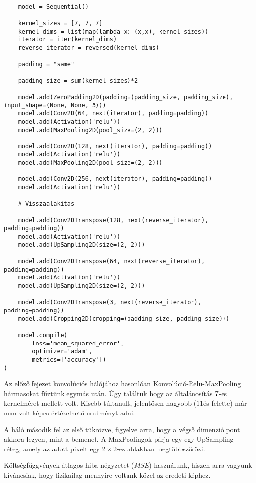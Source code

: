 \lstset{language=Python}
\begin{lstlisting}  

	model = Sequential()
	
	kernel_sizes = [7, 7, 7]
	kernel_dims = list(map(lambda x: (x,x), kernel_sizes))
	iterator = iter(kernel_dims)
	reverse_iterator = reversed(kernel_dims)
	
	padding = "same"
	
	padding_size = sum(kernel_sizes)*2
	
	model.add(ZeroPadding2D(padding=(padding_size, padding_size), input_shape=(None, None, 3)))
	model.add(Conv2D(64, next(iterator), padding=padding))
	model.add(Activation('relu'))
	model.add(MaxPooling2D(pool_size=(2, 2)))
	
	model.add(Conv2D(128, next(iterator), padding=padding))
	model.add(Activation('relu'))
	model.add(MaxPooling2D(pool_size=(2, 2)))
	
	model.add(Conv2D(256, next(iterator), padding=padding))
	model.add(Activation('relu'))
	
	# Visszaalakitas
	
	model.add(Conv2DTranspose(128, next(reverse_iterator), padding=padding))
	model.add(Activation('relu'))
	model.add(UpSampling2D(size=(2, 2)))
	
	model.add(Conv2DTranspose(64, next(reverse_iterator), padding=padding))
	model.add(Activation('relu'))
	model.add(UpSampling2D(size=(2, 2)))
	
	model.add(Conv2DTranspose(3, next(reverse_iterator), padding=padding))
	model.add(Cropping2D(cropping=(padding_size, padding_size)))
	
	model.compile(
		loss='mean_squared_error',
		optimizer='adam', 
		metrics=['accuracy']) 
) 

\end{lstlisting}


Az előző fejezet konvolúciós hálójához hasonlóan Konvolúció-Relu-MaxPooling hármasokat
fűztünk egymás után. Úgy találtuk hogy az általánosítás $ 7 \time 7 $-es kernelméret 
mellett volt. Kisebb túltanult, jelentősen nagyobb ($ 11  $és felette) már nem volt 
képes értékelhető eredményt adni.

A háló második fel az első tükrözve, figyelve arra, hogy a végső dimenzió pont akkora 
legyen, mint a bemenet. A MaxPoolingok párja egy-egy UpSampling réteg, amely az adott
pixelt egy $ 2 \times 2 $-es ablakban megtöbbszörözi.

Költségfüggvények átlagos hiba-négyzetet (\textit{MSE}) használunk, hiszen arra vagyunk 
kíváncsiak, hogy fizikailag mennyire voltunk közel az eredeti képhez.


